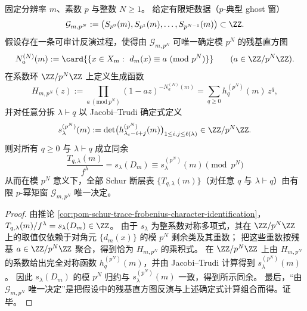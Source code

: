 \begin{proposition}\label{prop:pom-schur-channels-mod-pN-from-ptypical-ghost}
固定分辨率 \(m\)、素数 \(p\) 与整数 \(N\ge 1\)。
给定有限矩数据（\(p\)-典型 ghost 窗）
\[
\mathcal G_{m,p^N}:=\bigl(S_{p^0}(m),S_{p^1}(m),\dots,S_{p^{N-1}}(m)\bigr)\subset\ZZ.
\]
假设存在一条可审计反演过程，使得由 \(\mathcal G_{m,p^N}\) 可唯一确定模 \(p^N\) 的残基直方图
\[
N_a^{(N)}(m):=\card{\{x\in X_m:\ d_m(x)\equiv a\ (\mathrm{mod}\ p^N)\}}\qquad(a\in\ZZ/p^N\ZZ).
\]
在系数环 \(\ZZ/p^N\ZZ\) 上定义生成函数
\[
H_{m,p^N}(z)
:=\prod_{a\ (\mathrm{mod}\ p^N)}(1-az)^{-N_a^{(N)}(m)}
=\sum_{q\ge 0}h_q^{(p^N)}(m)\,z^q,
\]
并对任意分拆 \(\lambda\vdash q\) 以 Jacobi--Trudi 确定式定义
\[
s_\lambda^{(p^N)}(m):=\det\bigl(h_{\lambda_i-i+j}^{(p^N)}(m)\bigr)_{1\le i,j\le \ell(\lambda)}
\in \ZZ/p^N\ZZ.
\]
则对所有 \(q\ge 0\) 与 \(\lambda\vdash q\) 成立同余
\[
\boxed{\;
\frac{T_{q,\lambda}(m)}{f^\lambda}
=s_\lambda(D_m)
\equiv
s_\lambda^{(p^N)}(m)\pmod{p^N}\;}
\]
从而在模 \(p^N\) 意义下，全部 Schur 断层表 \(\{T_{q,\lambda}(m)\}\)（对任意 \(q\) 与 \(\lambda\vdash q\)）由有限 \(p\)-幂矩窗 \(\mathcal G_{m,p^N}\) 唯一决定。
\end{proposition}
\begin{proof}
由推论 \ref{cor:pom-schur-trace-frobenius-character-identification}，
\(
T_{q,\lambda}(m)/f^\lambda=s_\lambda(D_m)\in\ZZ
\)。
由于 \(s_\lambda\) 为整系数对称多项式，其在 \(\ZZ/p^N\ZZ\) 上的取值仅依赖于对角元 \(\{d_m(x)\}\) 的模 \(p^N\) 剩余类及其重数；
把这些重数按残基 \(a\in\ZZ/p^N\ZZ\) 聚合，得到恰为 \(H_{m,p^N}\) 的乘积式。
在 \(\ZZ/p^N\ZZ\) 上由 \(H_{m,p^N}\) 的系数给出完全对称函数 \(h_q^{(p^N)}(m)\)，并由 Jacobi--Trudi 计算得到 \(s_\lambda^{(p^N)}(m)\)。
因此 \(s_\lambda(D_m)\) 的模 \(p^N\) 归约与 \(s_\lambda^{(p^N)}(m)\) 一致，得到所示同余。
最后，“由 \(\mathcal G_{m,p^N}\) 唯一决定”是把假设中的残基直方图反演与上述确定式计算组合而得。证毕。
\end{proof}

